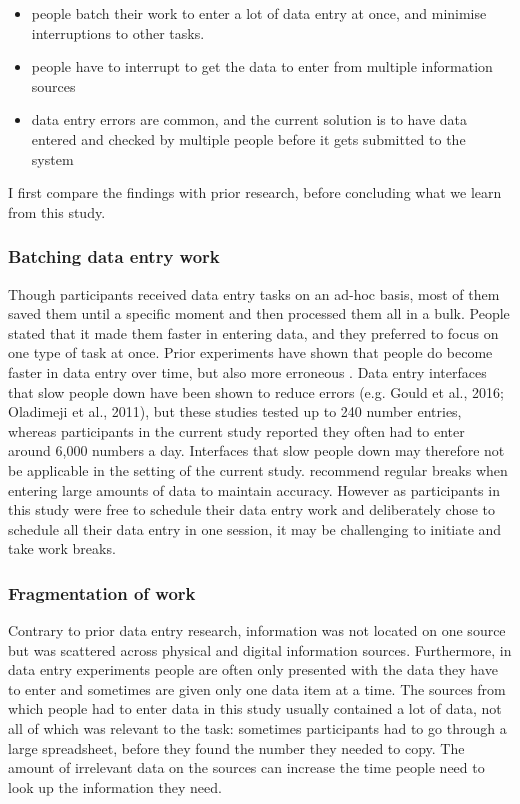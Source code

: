 \begin{itemize}

\item 
people batch their work to enter a lot of data entry at once, and minimise interruptions to other tasks. 
\item 
people have to interrupt to get the data to enter from multiple information sources
\item 
data entry errors are common, and the current solution is to have data entered and checked by multiple people before it gets submitted to the system
\end{itemize}

I first compare the findings with prior research, before concluding what we learn from this study. 

\subsubsection{Batching data entry work}
Though participants received data entry tasks on an ad-hoc basis, most of them saved them until a specific moment and then processed them all in a bulk. People stated that it made them faster in entering data, and they preferred to focus on one type of task at once. Prior experiments have shown that people do become faster in data entry over time, but also more erroneous \citep{Healy2004}. Data entry interfaces that slow people down have been shown to reduce errors (e.g. Gould et al., 2016; Oladimeji et al., 2011), but these studies tested up to 240 number entries, whereas participants in the current study reported they often had to enter around 6,000 numbers a day. Interfaces that slow people down may therefore not be applicable in the setting of the current study. \citet{Healy2004} recommend regular breaks when entering large amounts of data to maintain accuracy. However as participants in this study were free to schedule their data entry work and deliberately chose to schedule all their data entry in one session, it may be challenging to initiate and take work breaks. 

\subsubsection{Fragmentation of work}
Contrary to prior data entry research, information was not located on one source but was scattered across physical and digital information sources. Furthermore, in data entry experiments people are often only presented with the data they have to enter and sometimes are given only one data item at a time. The sources from which people had to enter data in this study usually contained a lot of data, not all of which was relevant to the task: sometimes participants had to go through a large spreadsheet, before they found the number they needed to copy. The amount of irrelevant data on the sources can increase the time people need to look up the information they need. 

